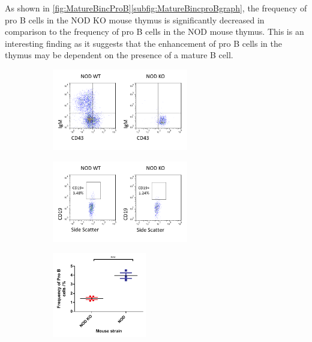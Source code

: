 As shown in \cref{fig:MatureBincProB}\ref{subfig:MatureBincproBgraph}, the frequency of pro B cells in the NOD KO mouse thymus is significantly decreased in comparison to the frequency of pro B cells in the NOD mouse thymus.
This is an interesting finding as it suggests that the enhancement of pro B cells in the thymus may be dependent on the presence of a mature B cell.


\begin{figure}
	\begin{subfigure}{\textwidth}
	\caption{}
	\includegraphics[width=0.65\textwidth]{Figures/NODvKOBM.png}
	\label{subfig:KOBM}
	\end{subfigure}
	\begin{subfigure}{\textwidth}
	\caption{}
	\includegraphics[width=0.65\textwidth]{Figures/NODvKOproBcells.png}
	\label{subfig:ThyProBcells}
	\end{subfigure}
	\begin{subfigure}{\textwidth}
	\caption{}
	\includegraphics[width=0.45\textwidth]{Figures/ProBNODKO.pdf}

\end{subfigure}
\end{figure}
